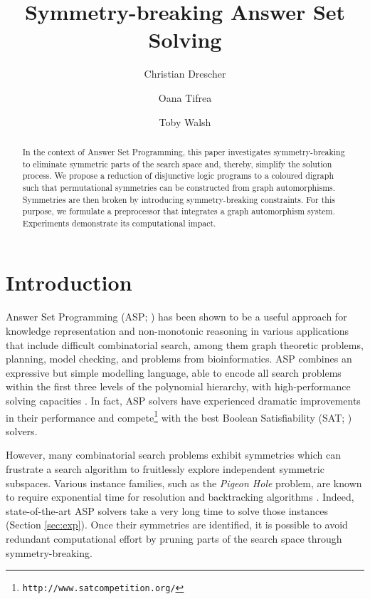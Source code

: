 \documentclass[envcountsame]{llncs}
\begin{document}
\title{Symmetry-breaking Answer Set Solving}

\author{Christian Drescher \and Oana Tifrea \and Toby Walsh}


\maketitle

\begin{abstract}
In the context of Answer Set Programming, this paper investigates symmetry-breaking to eliminate symmetric parts of the search space and, thereby, simplify the solution process.
We propose a reduction of disjunctive logic programs to a coloured digraph such that permutational symmetries can be constructed from graph automorphisms.
Symmetries are then broken by introducing symmetry-breaking constraints.
For this purpose, we formulate a preprocessor that integrates a graph automorphism system. Experiments demonstrate its computational impact.
\end{abstract}

\section{Introduction}
Answer Set Programming (ASP; \cite{baral03}) has been shown to be a useful approach for knowledge representation and non-monotonic reasoning in various applications that include difficult combinatorial search, among them graph theoretic problems, planning, model checking, and problems from bioinformatics. ASP combines an expressive but simple modelling language, able to encode all search problems within the first three levels of the polynomial hierarchy, with high-performance solving capacities \cite{drgegrkakoossc08a}. In fact, ASP solvers have experienced dramatic improvements in their performance \cite{gekasc09b} and compete\footnote{\texttt{http://www.satcompetition.org/}} with the best Boolean Satisfiability (SAT; \cite{bihemawa09a}) solvers.

However, many combinatorial search problems exhibit symmetries which can frustrate a search algorithm to fruitlessly explore independent symmetric subspaces. Various instance families, such as the \emph{Pigeon Hole} problem, are known to require exponential time for resolution and backtracking algorithms \cite{ur87a}. Indeed, state-of-the-art ASP solvers take a very long time to solve those instances (Section \ref{sec:exp}). Once their symmetries are identified, it is possible to avoid redundant computational effort by pruning parts of the search space through symmetry-breaking.
\end{document}
